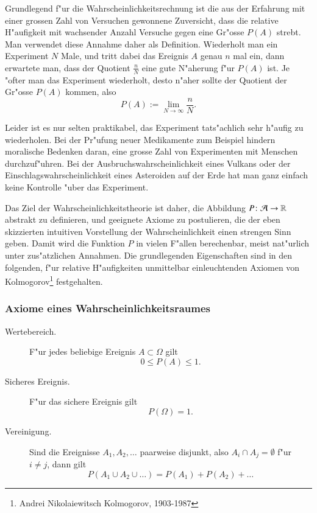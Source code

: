 Grundlegend f"ur die Wahrscheinlichkeitsrechnung ist die aus der
Erfahrung mit einer grossen Zahl von Versuchen gewonnene Zuversicht,
dass die relative H"aufigkeit mit wachsender Anzahl Versuche gegen
eine Gr"osse $P(A)$ strebt. Man verwendet diese Annahme daher als
Definition. Wiederholt
man ein Experiment $N$ Male, und tritt dabei das Ereignis $A$
genau $n$ mal ein, dann erwartete man, dass der Quotient $\frac{n}{N}$
eine gute N"aherung f"ur $P(A)$ ist. Je "ofter man das Experiment
wiederholt, desto n"aher sollte der Quotient der Gr"osse $P(A)$
kommen, also
\[
P(A) := \lim_{N\to\infty}\frac{n}{N}.
\]

Leider ist es nur selten praktikabel, das Experiment tats"achlich
sehr h"aufig zu wiederholen.  Bei der Pr"ufung neuer Medikamente
zum Beispiel hindern moralische Bedenken daran, eine grosse
Zahl von Experimenten mit Menschen durchzuf"uhren. Bei der
Ausbruchswahrscheinlichkeit eines Vulkans oder der
Einschlagswahrscheinlichkeit eines Asteroiden auf der Erde hat man
ganz einfach keine Kontrolle "uber das Experiment.

Das Ziel der Wahrscheinlichkeitstheorie ist daher, 
die Abbildung $P\colon {\cal A}\to\mathbb{R}$
abstrakt zu definieren, und geeignete Axiome zu postulieren, die
der eben skizzierten intuitiven Vorstellung der Wahrscheinlichkeit
einen strengen Sinn geben. Damit wird die Funktion $P$ in vielen
F"allen berechenbar, meist nat"urlich unter zus"atzlichen Annahmen.
Die grundlegenden Eigenschaften sind in den folgenden, f"ur
relative H"aufigkeiten unmittelbar einleuchtenden Axiomen
von Kolmogorov\footnote{Andrei Nikolaiewitsch Kolmogorov, 1903-1987}
festgehalten.

\subsubsection{Axiome  eines Wahrscheinlichkeitsraumes}

\begin{description}
\item[Wertebereich.]F"ur jedes beliebige Ereignis $A\subset \Omega$
gilt
\begin{equation}
0\le P(A)\le 1.
\label{p-wertebereich}
\end{equation}
\item[Sicheres Ereignis.] F"ur das sichere Ereignis gilt
\begin{equation}
P(\Omega) = 1.
\label{p-sicheresereignis}
\end{equation}
\item[Vereinigung.] Sind die Ereignisse $A_1,A_2,\dots$ paarweise
disjunkt, also $A_i\cap A_j=\emptyset$ f"ur $i\ne j$, dann gilt
\begin{equation}
P(A_1\cup A_2\cup \dots) = P(A_1) + P(A_2) + \dots
\label{p-summenformel}
\end{equation}
\end{description}

